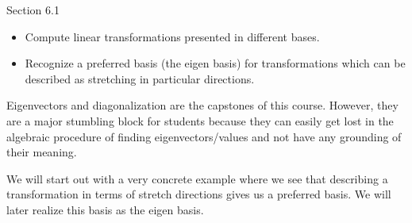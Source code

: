\documentclass{problemset}
\begin{document}
\begin{lesson}

	Section 6.1

	\begin{itemize}
		\item Compute linear transformations presented in different bases.
		\item Recognize a preferred basis (the eigen basis) for transformations
			which can be described as stretching in particular directions.
	\end{itemize}

	Eigenvectors and diagonalization are the capstones of this course. However,
	they are a major stumbling block for students because they can easily get lost in
	the algebraic procedure of finding eigenvectors/values and not have any grounding
	of their meaning.

	We will start out with a very concrete example where we see that
	describing a transformation in terms of stretch directions gives us a preferred basis.
	We will later realize this basis as the eigen basis.

\end{lesson}
\end{document}
